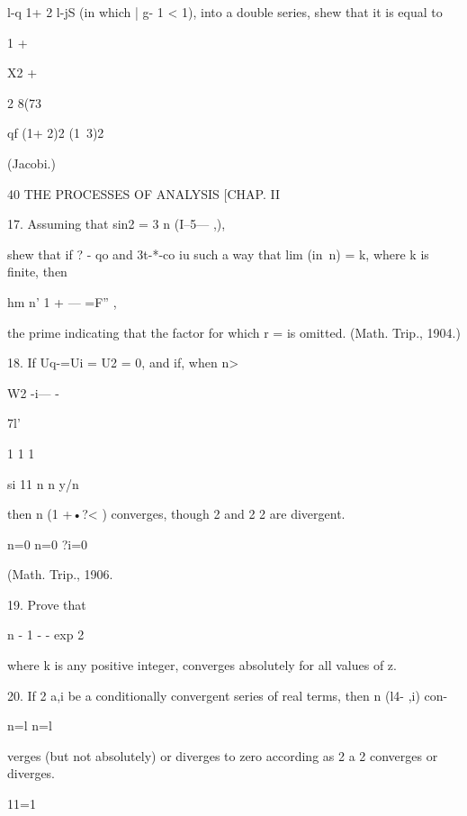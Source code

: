 l-q 1+ 2 l-jS 
(in which | g- 1 < 1), into a double series, shew that it is equal to 



1 + 



X2 + 



2 8(73 



  qf (1+ 2)2 (1\  3)2 



(Jacobi.) 



40 THE PROCESSES OF ANALYSIS [CHAP. II 

17. Assuming that sin2 = 3 n (I--5— ,), 

shew that if ? - qo and 3t-*-co iu such a way that lim (in\ n) = k, where k is finite, then 

hm n' 1 + — =F''  , 



the prime indicating that the factor for which r = is omitted. (Math. Trip., 1904.) 

18. If Uq-=Ui = U2 = 0, and if, when n>\, 



W2 -i— - 



 7l' 



1 1 1 

si 11 n n y/n 



then n (1 +•?< ) converges, though 2    and 2   2 are divergent. 

n=0 n=0 ?i=0 



(Math. Trip., 1906. 



19. Prove that 



n -  1 - - exp 2 



where k is any positive integer, converges absolutely for all values of z. 

20. If 2 a,i be a conditionally convergent series of real terms, then n (l4- ,i) con- 

n=l n=l 

verges (but not absolutely) or diverges to zero according as 2 a 2 converges or diverges. 

11=1 

